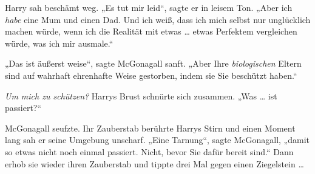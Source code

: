 Harry sah beschämt weg.
„Es tut mir leid“, sagte er in leisem Ton.
„Aber ich \emph{habe} eine Mum und einen Dad. Und ich weiß, dass ich mich selbst nur unglücklich machen würde, wenn ich die Realität mit etwas … etwas Perfektem vergleichen würde, was ich mir ausmale.“

„Das ist äußerst weise“, sagte McGonagall sanft.
„Aber Ihre \emph{biologischen} Eltern sind auf wahrhaft ehrenhafte Weise gestorben, indem sie Sie beschützt haben.“

\emph{Um mich zu schützen?} Harrys Brust schnürte sich zusammen.
„Was … ist passiert?“

McGonagall seufzte. Ihr Zauberstab berührte Harrys Stirn und einen Moment lang sah er seine Umgebung unscharf.
„Eine Tarnung“, sagte McGonagall, „damit so etwas nicht noch einmal passiert. Nicht, bevor Sie dafür bereit sind.“ Dann erhob sie wieder ihren Zauberstab und tippte drei Mal gegen einen Ziegelstein …

